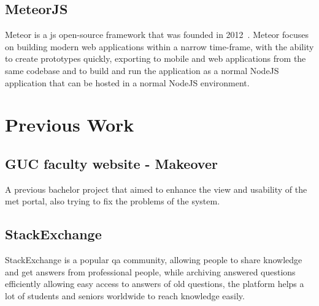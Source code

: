 \subsection{MeteorJS}
\label{sub:meteor}
Meteor is a \ac{js} open-source framework that was founded in 2012~\cite{meteor_launch}.
Meteor focuses on building modern web applications within a narrow time-frame, with the ability to create prototypes quickly, exporting to mobile
and web applications from the same codebase and to build and run the application as a normal NodeJS application that can be hosted in a normal
NodeJS environment.

\section{Previous Work}
\label{sec:previous-work}

\subsection{GUC faculty website - Makeover}
\label{sub:met-makeover-project}
A previous bachelor project that aimed to enhance the view and usability of the \ac{met} portal, also trying to fix the
problems of the system.~\cite{met-makeover}

\subsection{StackExchange}
\label{sub:stackexchange}
StackExchange is a popular \ac{qa} community, allowing people to share knowledge and get answers from professional
people, while archiving answered questions efficiently allowing easy access to answers of old questions, the
platform helps a lot of students and seniors worldwide to reach knowledge easily.
